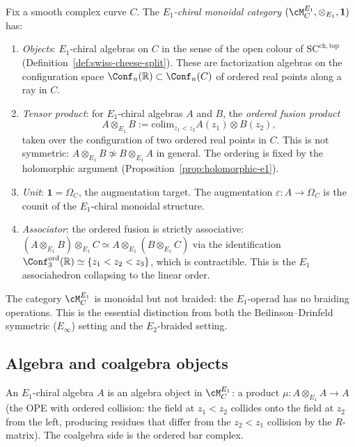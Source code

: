 \begin{definition}
\label{def:e1-chiral-monoidal}
Fix a smooth complex curve $C$. The \emph{$E_1$-chiral monoidal category}
$(\cM^{E_1}_C, \otimes_{E_1}, \mathbf{1})$ has:
\begin{enumerate}[label=(\roman*)]
 \item \emph{Objects}: $E_1$-chiral algebras on $C$ in the sense of the
 open colour of $\mathrm{SC}^{\mathrm{ch},\mathrm{top}}$
 (Definition~\ref{def:swiss-cheese-split}). These are factorization
 algebras on the configuration space $\Conf_n(\mathbb{R}) \subset \Conf_n(C)$
 of ordered real points along a ray in $C$.
 \item \emph{Tensor product}: for $E_1$-chiral algebras $A$ and $B$,
 the \emph{ordered fusion product}
 \[
 A \otimes_{E_1} B := \mathrm{colim}_{z_1 < z_2} A(z_1) \otimes B(z_2),
 \]
 taken over the configuration of two ordered real points in $C$. This is
 not symmetric: $A \otimes_{E_1} B \not\simeq B \otimes_{E_1} A$ in
 general. The ordering is fixed by the holomorphic argument
 (Proposition~\ref{prop:holomorphic-e1}).
 \item \emph{Unit}: $\mathbf{1} = \Omega_C$, the augmentation target.
 The augmentation $\varepsilon \colon A \to \Omega_C$ is the counit of
 the $E_1$-chiral monoidal structure.
 \item \emph{Associator}: the ordered fusion is strictly associative:
 $(A \otimes_{E_1} B) \otimes_{E_1} C \simeq A \otimes_{E_1} (B \otimes_{E_1} C)$
 via the identification $\Conf_3^{\mathrm{ord}}(\mathbb{R}) \simeq \{z_1 < z_2 < z_3\}$,
 which is contractible. This is the $E_1$ associahedron collapsing to
 the linear order.
\end{enumerate}
The category $\cM^{E_1}_C$ is monoidal but not braided: the $E_1$-operad
has no braiding operations. This is the essential distinction from both
the Beilinson--Drinfeld symmetric ($E_\infty$) setting and the $E_2$-braided
setting.
\end{definition}

\subsection{Algebra and coalgebra objects}
\label{subsec:e1-alg-coalg}

An $E_1$-chiral algebra $A$ is an algebra object in $\cM^{E_1}_C$:
a product $\mu \colon A \otimes_{E_1} A \to A$
(the OPE with ordered collision: the field at $z_1 < z_2$ collides
onto the field at $z_2$ from the left, producing residues that differ
from the $z_2 < z_1$ collision by the $R$-matrix). The coalgebra side
is the ordered bar complex.

